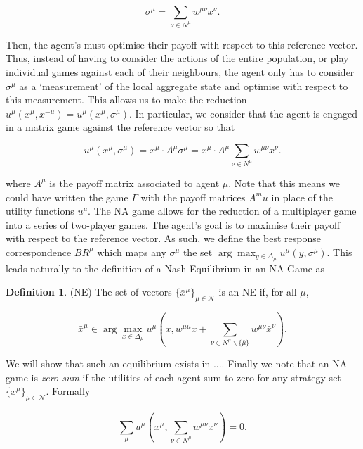 \documentclass{article}
\theoremstyle{definition}
\newtheorem*{definition}{Definition}
\newcommand{\agentset}{\mathcal{N}}
\newcommand{\utility}[1]{u^{#1}}
\newcommand{\wmunu}{w^{\mu \nu}}
\newcommand{\xmu}{x^{\mu}}
\newcommand{\xnu}{x^{\nu}}
\newcommand{\refmu}{\sigma^{\mu}}
\newcommand{\NE}[1]{\bar{x}^{#1}}
\newcommand{\weightedsum}{ \sum_{\nu \in N^\mu} \wmunu \xnu}
\newcommand{\xnotmu}{x^{-\mu}}
\begin{document}
	\begin{equation}
		\sigma^\mu = \sum_{\nu \in N^\mu} \wmunu \xnu.
	\end{equation}

	Then, the agent's must optimise their payoff with respect to this reference vector. Thus,
	instead of having to consider the actions of the entire population, or play individual games
	against each of their neighbours, the agent only has to consider $\sigma^\mu$ as a `measurement'
	of the local aggregate state and optimise with respect to this measurement. This allows us to
	make the reduction $u^\mu(\xmu, \xnotmu) = u^\mu(\xmu, \refmu)$. In particular, we consider that
	the agent is engaged in a matrix game against the reference vector so that

	\begin{equation}
		u^\mu(\xmu, \refmu) = \xmu \cdot A^\mu \refmu = \xmu \cdot A^\mu \weightedsum.
	\end{equation}

	where $A^\mu$ is the payoff matrix associated to agent $\mu$. Note that this means we could have
	written the game $\Gamma$ with the payoff matrices $A^mu$ in place of the utility functions
	$\utility{\mu}$. The NA game allows for the reduction of a
	multiplayer game into a series of two-player games. The agent's goal is to maximise their payoff
	with respect to the reference vector. As such, we define the best response correspondence
	$BR^\mu$ which maps any $\refmu$ the set $\arg \max_{y \in \Delta_\mu} {u^\mu(y, \refmu)}$. This
	leads naturally to the definition of a Nash Equilibrium in an NA Game as

	\begin{definition}(NE)
		The set of vectors $\{ \NE{\mu}\}_{\mu \in \agentset}$ is an NE if, for all $\mu$,
		
		\begin{equation*}
		\NE{\mu} \in \arg \max_{x \in \Delta_\mu} u^\mu(x, w^{\mu \mu} x + \sum_{\nu \in N^\mu \backslash \{\bar{\mu}\}} \wmunu \NE{\nu}).
		\end{equation*}
		
	\end{definition}

	We will show that such an equilibrium exists in .... Finally we note that an NA game is \emph{zero-sum} if the utilities of each agent sum to zero for any strategy set $\{ \xmu \}_{\mu \in \agentset}$. Formally

	\begin{equation}
		\sum_\mu u^\mu(\xmu, \weightedsum) = 0.
	\end{equation}
\end{document}
